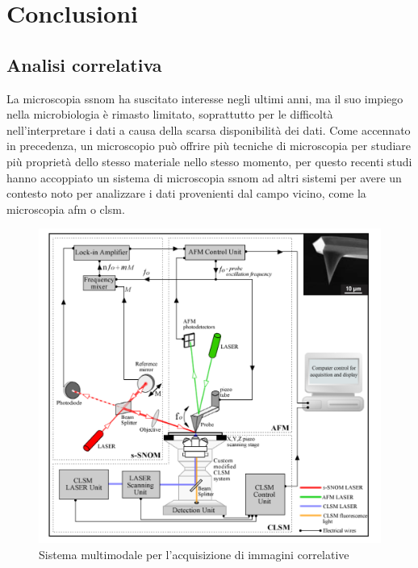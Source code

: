 \documentclass[../main.tex]{subfiles}
\begin{document}
\chapter{Conclusioni}


\section{Analisi correlativa}
La microscopia \acrshort{ssnom} ha suscitato interesse negli ultimi anni, ma il suo impiego nella \gls{microbiologia} è rimasto limitato, soprattutto per le difficoltà nell'interpretare i dati a causa della scarsa disponibilità dei dati. Come accennato in precedenza, un microscopio può offrire più tecniche di microscopia per studiare più proprietà dello stesso materiale nello stesso momento, per questo recenti studi hanno accoppiato un sistema di microscopia \acrshort{ssnom} ad altri sistemi per avere un contesto noto per analizzare i dati provenienti dal campo vicino, come la microscopia \acrfull{afm} o \acrshort{clsm}.\cite{stanciu_2017}\\

\begin{figure}[h]
	\centering
	\includegraphics[keepaspectratio, height=\linewidth]{images/multimodal_system.jpg}
	\caption[Sistema multimodale per l'acquisizione di immagini correlative]{
		Sistema multimodale per l'acquisizione di immagini correlative \cite{stanciu_2017}}
	\label{fig:multimodal_system}
\end{figure}
\end{document}
